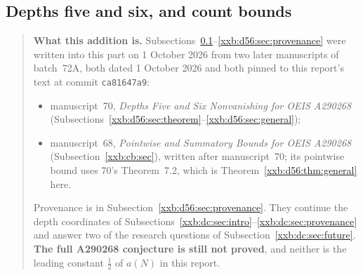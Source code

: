 \documentclass[11pt,a4paper]{article}
\numberwithin{equation}{section}
\theoremstyle{definition}
\theoremstyle{remark}
\theoremstyle{plain}
\begin{document}

\subsection{Depths five and six, and count bounds}\label{xxb:d56:sec:intro}

\begin{quote}\small
\textbf{What this addition is.}
Subsections~\ref{xxb:d56:sec:intro}--\ref{xxb:d56:sec:provenance} were
written into this part on 1 October 2026 from two later manuscripts of
batch~72A, both dated 1 October 2026 and both pinned to this report's text at
commit \texttt{ca81647a9}:
\begin{itemize}[leftmargin=1.4em,itemsep=1pt]
\item manuscript~70, \emph{Depths Five and Six Nonvanishing for OEIS A290268}
 (Subsections~\ref{xxb:d56:sec:theorem}--\ref{xxb:d56:sec:general});
\item manuscript~68, \emph{Pointwise and Summatory Bounds for OEIS A290268}
 (Subsection~\ref{xxb:cb:sec}), written after manuscript~70; its pointwise
 bound uses 70's Theorem~7.2, which is Theorem~\ref{xxb:d56:thm:general}
 here.
\end{itemize}
Provenance is in Subsection~\ref{xxb:d56:sec:provenance}.  They continue the
depth coordinates of Subsections~\ref{xxb:dc:sec:intro}--\ref{xxb:dc:sec:provenance}
and answer two of the research questions of
Subsection~\ref{xxb:dc:sec:future}.  \textbf{The full A290268 conjecture is
still not proved}, and neither is the leading constant $\tfrac12$ of
$a(N)$ in this report.


\end{quote}
\end{document}

